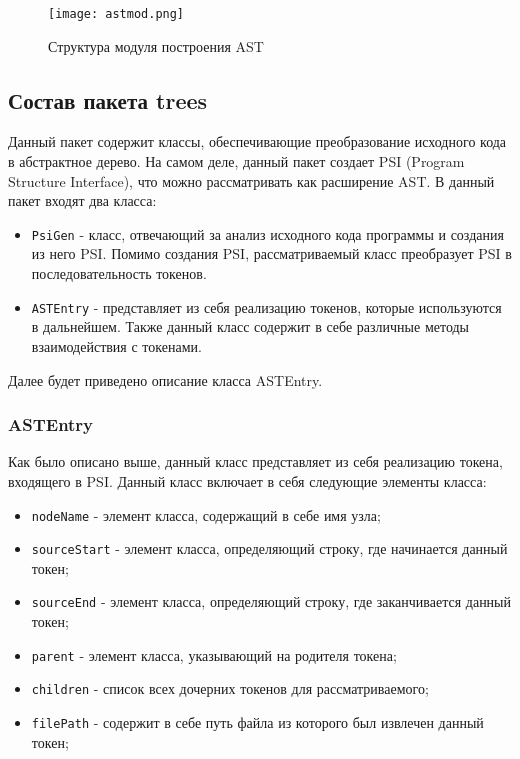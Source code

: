 \begin{figure}[htbp]
\centering
\texttt{[image: astmod.png]}
\caption{Структура модуля построения AST}
\label{fig:astmod}
\end{figure}

\subsection{Состав пакета trees}

Данный пакет содержит классы, обеспечивающие преобразование исходного кода в абстрактное дерево. На самом деле, данный пакет создает PSI (Program Structure Interface), что можно рассматривать как расширение AST. В данный пакет входят два класса:

\begin{itemize}
\setlength\itemsep{0mm}
\item \texttt{PsiGen} - класс, отвечающий за анализ исходного кода программы и создания из него PSI. Помимо создания PSI, рассматриваемый класс преобразует PSI в последовательность токенов.
\item \texttt{ASTEntry} - представляет из себя реализацию токенов, которые используются в дальнейшем. Также данный класс содержит в себе различные методы взаимодействия с токенами.
\end{itemize}


Далее будет приведено описание класса ASTEntry.

\subsubsection{ASTEntry}

Как было описано выше, данный класс представляет из себя реализацию токена, входящего в PSI. Данный класс включает в себя следующие элементы класса:

\begin{itemize}
\setlength\itemsep{0mm}
\item \texttt{nodeName} - элемент класса, содержащий в себе имя узла;
\item \texttt{sourceStart} - элемент класса, определяющий строку, где начинается данный токен;
\item \texttt{sourceEnd} - элемент класса, определяющий строку, где заканчивается данный токен;
\item \texttt{parent} - элемент класса, указывающий на родителя токена;
\item \texttt{children} - список всех дочерних токенов для рассматриваемого;
\item \texttt{filePath} - содержит в себе путь файла из которого был извлечен данный токен;
\end{itemize}

